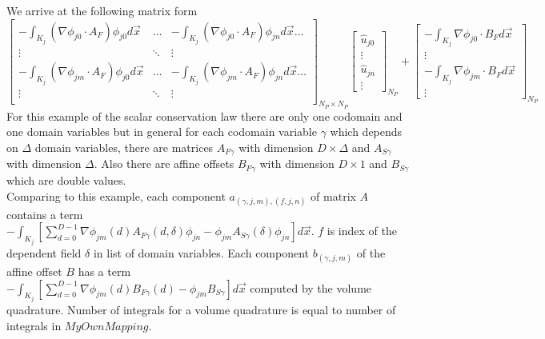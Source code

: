 \documentclass[BoSSSForSolvingConservationLaws.tex]{subfiles}
\begin{document}
We arrive at the following matrix form
\[
\begin{bmatrix}
-\int_{K_j} (\nabla \phi_{j0}\cdot A_F) \phi_{j0} d\vec{x} & \dots & -\int_{K_j} (\nabla \phi_{j0}\cdot A_F) \phi_{jn} d\vec{x}  \dots\\
\vdots                                                     &\ddots &\vdots\\
-\int_{K_j} (\nabla \phi_{jm}\cdot A_F) \phi_{j0} d\vec{x} & \dots & -\int_{K_j} (\nabla \phi_{jm}\cdot A_F) \phi_{jn}
d\vec{x}  \dots\\
\vdots                                                     &\ddots &\vdots\\
\end{bmatrix}_{N_P \times N_P}
\begin{bmatrix}
\hat u_{j0}\\
\vdots\\
\hat u_{jn}\\
\vdots
\end{bmatrix}_{N_P}+
\begin{bmatrix}
-\int_{K_j} \nabla \phi_{j0}\cdot B_F d\vec{x}\\
\vdots\\
-\int_{K_j} \nabla \phi_{jm}\cdot B_F d\vec{x}\\
\vdots
\end{bmatrix}_{N_P}
\]
For this example of the scalar conservation law there are only one codomain and one domain variables but in general for each codomain variable $\gamma$ which depends on $\Delta$ domain variables, there are matrices $A_{F\gamma}$ with dimension $D\times \Delta$ and $A_{S\gamma}$ with dimension $\Delta$. Also there are affine offsets $B_{F\gamma}$ with dimension $D\times1$ and $B_{S\gamma}$ which are double values.\\
Comparing to this example, each component $a_{(\gamma,j,m),(f,j,n)}$ of matrix $A$ contains a term \\$-\int_{K_j}[ \sum_{d=0}^{D-1} \nabla \phi_{jm}(d) A_{F\gamma}(d,\delta) \phi_{jn}-\phi_{jm}A_{S\gamma}(\delta)\phi_{jn}] d\vec{x}$. $f$ is index of the dependent field $\delta$ in list of domain variables. Each component $b_{(\gamma,j,m)}$ of the affine offset $B$  has a term \\$-\int_{K_j} [\sum_{d=0}^{D-1}\nabla \phi_{jm}(d) B_{F\gamma}(d)-\phi_{jm}B_{S\gamma}] d\vec{x}$ computed by the volume quadrature. Number of integrals for a volume quadrature is equal to number of integrals in $MyOwnMapping$.
\end{document}
